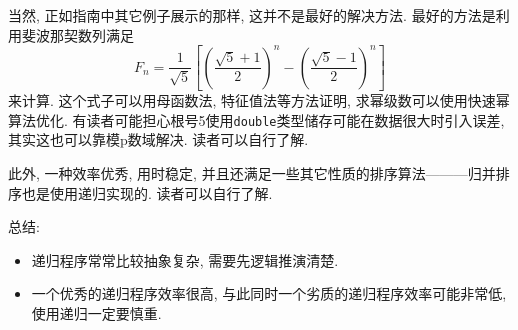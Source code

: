         当然, 正如指南中其它例子展示的那样, 这并不是最好的解决方法. 最好的方法是利用斐波那契数列满足
            \[ F_n = \dfrac{1}{\sqrt{5}} \left[ \left( \dfrac{\sqrt{5} + 1}{2} \right)^n - \left( \dfrac{\sqrt{5} - 1}{2} \right)^n \right] \]
        来计算. 这个式子可以用母函数法, 特征值法等方法证明, 求幂级数可以使用快速幂算法优化. 有读者可能担心根号5使用\texttt{double}类型储存可能在数据很大时引入误差, 其实这也可以靠模p数域解决. 读者可以自行了解.

        此外, 一种效率优秀, 用时稳定, 并且还满足一些其它性质的排序算法———归并排序也是使用递归实现的. 读者可以自行了解.

        总结:
        \begin{itemize}
            \item 递归程序常常比较抽象复杂, 需要先逻辑推演清楚.
            \item 一个优秀的递归程序效率很高, 与此同时一个劣质的递归程序效率可能非常低, 使用递归一定要慎重.
        \end{itemize}